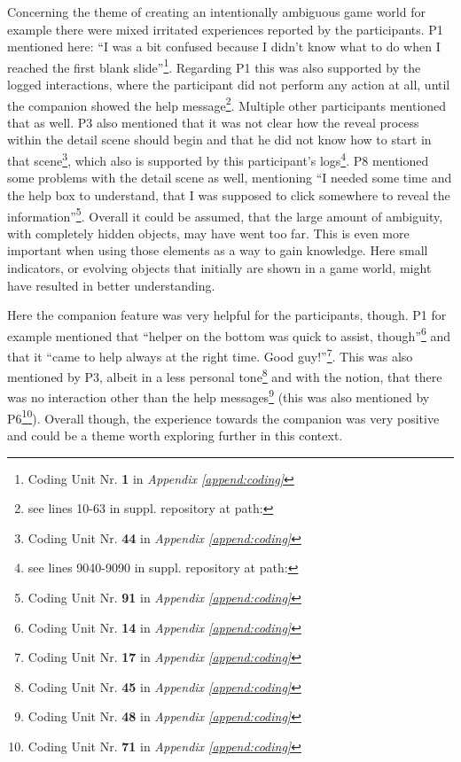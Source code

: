 Concerning the theme of creating an intentionally ambiguous game world for example there were mixed irritated experiences reported by the participants. P1 mentioned here: \enquote{I was a bit confused because I didn't know what to do when I reached the first blank slide}\footnote{Coding Unit Nr. \textbf{1} in \textit{Appendix \ref{append:coding}}}. Regarding P1 this was also supported by the logged interactions, where the participant did not perform any action at all, until the companion showed the help message\footnote{see lines 10-63 in suppl. repository at path: }. Multiple other participants mentioned that as well. P3 also mentioned that it was not clear how the reveal process within the detail scene should begin and that he did not know how to start in that scene\footnote{Coding Unit Nr. \textbf{44} in \textit{Appendix \ref{append:coding}}}, which also is supported by this participant's logs\footnote{see lines 9040-9090 in suppl. repository at path: }. P8 mentioned some problems with the detail scene as well, mentioning \enquote{I needed some time and the help box to understand, that I was supposed to click somewhere to reveal the information}\footnote{Coding Unit Nr. \textbf{91} in \textit{Appendix \ref{append:coding}}}. Overall it could be assumed, that the large amount of ambiguity, with completely hidden objects, may have went too far. This is even more important when using those elements as a way to gain knowledge. Here small indicators, or evolving objects that initially are shown in a game world, might have resulted in better understanding.

Here the companion feature was very helpful for the participants, though. P1 for example mentioned that \enquote{helper on the bottom was quick to assist, though}\footnote{Coding Unit Nr. \textbf{14} in \textit{Appendix \ref{append:coding}}} and that it \enquote{came to help always at the right time. Good guy!}\footnote{Coding Unit Nr. \textbf{17} in \textit{Appendix \ref{append:coding}}}. This was also mentioned by P3, albeit in a less personal tone\footnote{Coding Unit Nr. \textbf{45} in \textit{Appendix \ref{append:coding}}} and with the notion, that there was no interaction other than the help messages\footnote{Coding Unit Nr. \textbf{48} in \textit{Appendix \ref{append:coding}}} (this was also mentioned by P6\footnote{Coding Unit Nr. \textbf{71} in \textit{Appendix \ref{append:coding}}}). Overall though, the experience towards the companion was very positive and could be a theme worth exploring further in this context.

